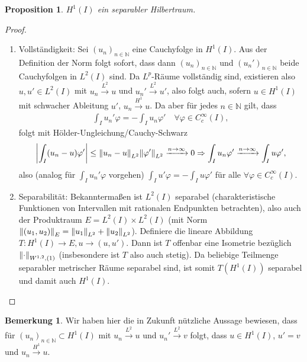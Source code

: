 \documentclass[twoside]{article}
\newtheorem{proposition}[theorem]{Proposition}
\theoremstyle{definition}
\newtheorem{remark}[theorem]{Bemerkung}
\begin{document}
\begin{proposition}
$H^1(I)$ ein separabler Hilbertraum.
\end{proposition}
\begin{proof} $ $
\begin{enumerate}
\item Vollständigkeit: Sei $(u_n)_{n \in \mathbb{N}}$ eine Cauchyfolge in $H^1(I)$. Aus der Definition der Norm folgt sofort, dass dann $(u_n)_{n \in \mathbb{N}}$ und $(u_n')_{n \in \mathbb{N}}$ beide Cauchyfolgen in $L^2(I)$ sind. Da $L^p$-Räume vollständig sind, existieren also $u,u' \in L^2(I)$ mit $u_n \xrightarrow{L^2} u$ und $u_n' \xrightarrow{L^2} u'$, also folgt auch, sofern $u \in H^1(I)$ mit schwacher Ableitung $u'$, $u_n \xrightarrow{H^1} u$. Da aber für jedes $n \in \mathbb{N}$ gilt, dass
\begin{align*}
\int_I u_n' \varphi = - \int_I u_n \varphi' \quad \forall \varphi \in C^\infty_c(I),
\end{align*}
folgt mit Hölder-Ungleichung/Cauchy-Schwarz
\begin{align*}
\abs{\int_I (u_n - u) \varphi'} \leq \norm{u_n-u}_{L^2} \norm{\varphi'}_{L^2} \xrightarrow{n \to \infty} 0 \Rightarrow \int_I u_n \varphi' \xrightarrow{n \to \infty} \int_I u \varphi',
\end{align*}
also (analog für $\int_I u_n' \varphi$ vorgehen) $\int_I u' \varphi = - \int_I u \varphi'$ für alle $\forall \varphi \in C^\infty_c(I)$.
\item Separabilität: Bekanntermaßen ist $L^2(I)$ separabel (charakteristische Funktionen von Intervallen mit rationalen Endpunkten betrachten), also auch der Produktraum $E=L^2(I) \times L^2(I)$ (mit Norm $\norm{(u_1,u_2)}_E = \norm{u_1}_{L^2} + \norm{u_2}_{L^2}$). Definiere die lineare Abbildung $T:H^1(I) \to E, u \to (u,u')$. Dann ist $T$ offenbar eine Isometrie bezüglich $\norm{\cdot}_{W^{1,2},(1)}$ (insbesondere ist $T$ also auch stetig). Da beliebige Teilmenge separabler metrischer Räume separabel sind, ist somit $T(H^1(I))$ separabel und damit auch $H^1(I)$.
\end{enumerate}
\end{proof}
\begin{remark} \label{bem:konv}
Wir haben hier die in Zukunft nützliche Aussage bewiesen, dass für $(u_n)_{n \in \mathbb{N}} \subset H^1(I)$ mit $u_n \xrightarrow{L^2} u$ und $u_n' \xrightarrow{L^2} v$ folgt, dass $u \in H^1(I)$, $u' = v$ und $u_n \xrightarrow{H^1} u$. 
\end{remark}
\end{document}
